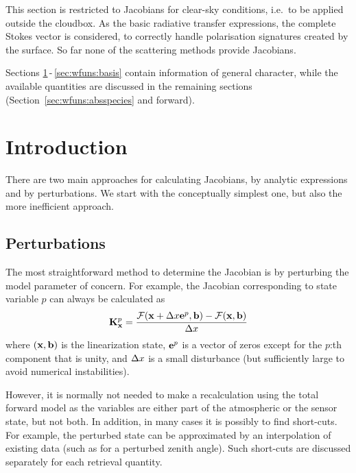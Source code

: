 This section is restricted to Jacobians for clear-sky conditions, i.e.\ to be
applied outside the cloudbox. As the basic radiative transfer expressions, the
complete Stokes vector is considered, to correctly handle polarisation
signatures created by the surface. So far none of the scattering methods
provide Jacobians.

Sections \ref{sec:wfuns:intro}\,-\,\ref{sec:wfuns:basis} contain information
of general character, while the available quantities are discussed in the
remaining sections (Section~\ref{sec:wfuns:absspecies} and forward).



\section{Introduction}
\label{sec:wfuns:intro}
%
There are two main approaches for calculating Jacobians, by analytic
expressions and by perturbations. We start with the conceptually simplest one,
but also the more inefficient approach.



\subsection{Perturbations}
\label{sec:wfuns:pert}
%
The most straightforward method to determine the Jacobian is by perturbing the
model parameter of concern. For example, the Jacobian corresponding to state
variable $p$ can always be calculated as
\begin{equation}
  \mathbf{K}_{\mathbf{x}}^p = \frac{\mathcal{F}(\mathbf{x}+\Delta x\mathbf{e}^p,
                      \mathbf{b})-\mathcal{F}(\mathbf{x},\mathbf{b})} {\Delta x}
 \label{eq:wfuns:perturb}
\end{equation}
where $(\mathbf{x},\mathbf{b})$ is the linearization state, $\mathbf{e}^p$ is a
vector of zeros except for the $p$:th component that is unity, and
$\Delta x$ is a small disturbance (but sufficiently large to avoid
numerical instabilities).

However, it is normally not needed to make a recalculation using the total
forward model as the variables are either part of the atmospheric or the sensor
state, but not both. In addition, in many cases it is possibly to find
short-cuts. For example, the perturbed state can be approximated by an
interpolation of existing data (such as for a perturbed zenith angle). Such
short-cuts are discussed separately for each retrieval quantity.



